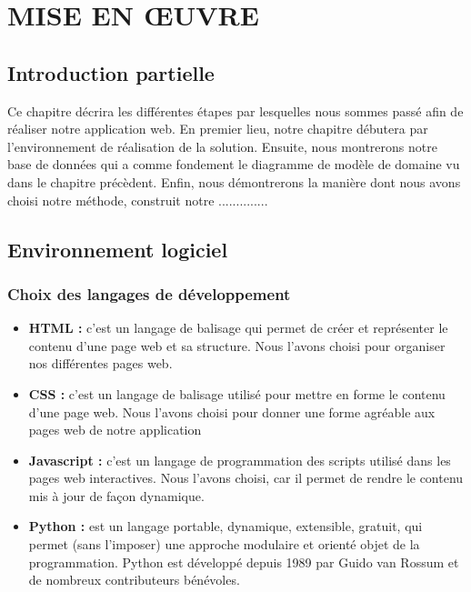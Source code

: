 \chapter[MISE EN ŒUVRE]{MISE EN ŒUVRE}
    \section[Introduction partielle]{Introduction partielle}
    Ce chapitre décrira les différentes étapes par lesquelles nous
    sommes passé afin de réaliser notre application web. En premier
    lieu, notre chapitre débutera par l’environnement de réalisation
    de la solution. Ensuite, nous montrerons notre base de données qui a
    comme fondement le diagramme de modèle de domaine vu dans
    le chapitre précèdent. Enfin, nous démontrerons la manière dont
    nous avons choisi notre méthode, construit notre ..............
    \section[Environnement logiciel]{Environnement logiciel}
        \subsection[Choix des langages de développement]{Choix des langages de développement}
            \begin{itemize}
                \setlength{\itemsep}{0pt}
                \item [\ding{226}] \textbf{HTML :} c’est un langage de balisage qui permet de créer et représenter le
                contenu d’une page web et sa structure. Nous l’avons choisi pour organiser nos
                différentes pages web.
                \item [\ding{226}] \textbf{CSS :} c’est un langage de balisage utilisé pour mettre en forme le contenu d’une
                page web. Nous l’avons choisi pour donner une forme agréable aux pages web
                de notre application
                \item [\ding{226}] \textbf{Javascript :} c’est un langage de programmation des scripts utilisé dans les pages
                web interactives. Nous l’avons choisi, car il permet de rendre le contenu mis à
                jour de façon dynamique.
                \item [\ding{226}] \textbf{Python :} est un langage portable, dynamique, extensible, gratuit, qui permet (sans l’imposer) une approche
                modulaire et orienté objet de la programmation. Python est développé depuis 1989 par Guido van Rossum
                et de nombreux contributeurs bénévoles. \cite*{Swinnen2012}
            \end{itemize}
